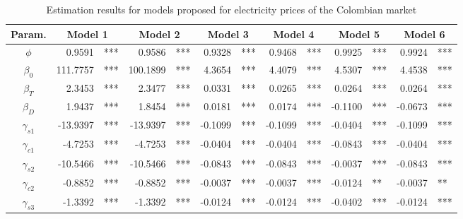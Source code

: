 \documentclass[3p]{elsarticle}
\begin{document}
\begin{table}[]
\centering
\caption{Estimation results for models proposed for electricity prices of the Colombian market}
\label{tab:est}
\begin{tabular}{crlrlrlrlrlrl}
\multicolumn{1}{c|}{Param.}   & \multicolumn{2}{c}{Model 1} & \multicolumn{2}{c}{Model 2} & \multicolumn{2}{c}{Model 3} & \multicolumn{2}{c}{Model 4} & \multicolumn{2}{c}{Model 5} & \multicolumn{2}{c}{Model 6} \\ \hline
\multicolumn{1}{c|}{$\phi$}      & 0.9591          & ***       & 0.9586          & ***       & 0.9328         & ***        & 0.9468         & ***        & 0.9925         & ***           & 0.9924          & ***          \\
\multicolumn{1}{c|}{$\beta_0$}   & 111.7757        & ***       & 100.1899        & ***       & 4.3654         & ***        & 4.4079         & ***        & 4.5307         & ***        & 4.4538         & ***       \\
\multicolumn{1}{c|}{$\beta_T$}   & 2.3453          & ***       & 2.3477          & ***       & 0.0331         & ***        & 0.0265         & ***        & 0.0264         & ***        & 0.0264         & ***       \\
\multicolumn{1}{c|}{$\beta_D$}   & 1.9437          & ***       & 1.8454          & ***       & 0.0181         & ***        & 0.0174         & ***        & -0.1100        & ***        & -0.0673        & ***       \\
\multicolumn{1}{c|}{$\gamma_{s1}$} & -13.9397        & ***       & -13.9397        & ***       & -0.1099        & ***        & -0.1099        & ***        & -0.0404        & ***        & -0.1099        & ***       \\
\multicolumn{1}{c|}{$\gamma_{c1}$} & -4.7253         & ***       & -4.7253         & ***       & -0.0404        & ***        & -0.0404        & ***        & -0.0843        & ***        & -0.0404        & ***       \\
\multicolumn{1}{c|}{$\gamma_{s2}$} & -10.5466        & ***       & -10.5466        & ***       & -0.0843        & ***        & -0.0843        & ***        & -0.0037        & ***        & -0.0843        & ***       \\
\multicolumn{1}{c|}{$\gamma_{c2}$} & -0.8852         & ***       & -0.8852         & ***       & -0.0037        & ***        & -0.0037        & ***        & -0.0124        & **         & -0.0037        & **        \\
\multicolumn{1}{c|}{$\gamma_{s3}$} & -1.3392         & ***       & -1.3392         & ***       & -0.0124        & ***        & -0.0124        & ***        & -0.0402        & ***        & -0.0124         & ***       \\

\end{tabular}
\end{table}
\end{document}
